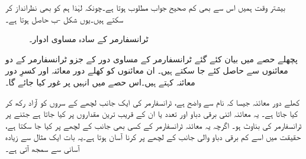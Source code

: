 بیشتر وقت ہمیں اس سے بھی کم صحیح جواب مطلوب ہوتا ہے۔چونکہ   لہٰذا ہم   کو بھی نظرانداز کر سکتے ہیں۔یوں شکل -ب حاصل ہوتا ہے۔
\begin{figure}
\centering
\caption{ٹرانسفارمر کے سادہ مساوی ادوار۔}
\label{شکل_ٹرانسفارمر_سادہ_ماڈل}
\end{figure}
پچھلے حصے میں بیان کئے گئے ٹرانسفارمر کے مساوی دور کے جزو ٹرانسفارمر کے دو معائنوں سے حاصل کئے جا سکتے ہیں۔ ان معائنوں کو کھلے دور معائنہ اور کسرِ دور معائنہ کہتے ہیں۔اس حصے میں انہیں پر غور کیا جائے گا۔

کھلے  دور معائنہ جیسا کہ نام سے واضح  ہے،  ٹرانسفارمر کی ایک جانب لچھے کے سروں کو آزاد رکھ کر کیا جاتا ہے۔ یہ معائنہ اتنی برقی دباو اور تعدد یا ان کے قریب ترین مقداروں پر کیا جاتا ہے جتنے پر ٹرانسفارمر کی بناوٹ ہو۔ اگرچہ یہ معائنہ ٹرانسفارمر کے کسی بھی جانب کے لچھے پر کیا جا سکتا ہے، حقیقت میں اسے کم برقی دباو والی جانب کے لچھے پر کرنا آسان ہوتا ہے۔یہ بات ایک مثال سے زیادہ آسانی سے سمجھ آتی ہے۔

